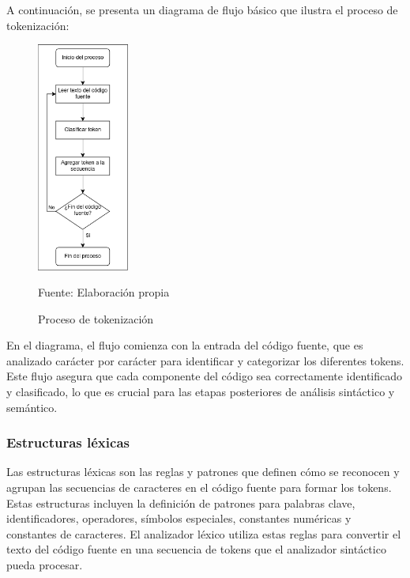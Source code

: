 A continuación, se presenta un diagrama de flujo básico que ilustra el proceso de tokenización:
\begin{figure}[!h]
  \centering
  \includegraphics[width=0.27\textwidth]{images/tokenizacion.png}
  \caption{Proceso de tokenización}
  \centering Fuente: Elaboración propia
  \label{fig:tokenizacion}
\end{figure}

En el diagrama, el flujo comienza con la entrada del código fuente, que es analizado carácter por carácter para identificar y categorizar los diferentes tokens. Este flujo asegura que cada componente del código sea correctamente identificado y clasificado, lo que es crucial para las etapas posteriores de análisis sintáctico y semántico.

\subsubsection{Estructuras léxicas}
Las estructuras léxicas son las reglas y patrones que definen cómo se reconocen y agrupan las secuencias de caracteres en el código fuente para formar los tokens. Estas estructuras incluyen la definición de patrones para palabras clave, identificadores, operadores, símbolos especiales, constantes numéricas y constantes de caracteres. El analizador léxico utiliza estas reglas para convertir el texto del código fuente en una secuencia de tokens que el analizador sintáctico pueda procesar.

